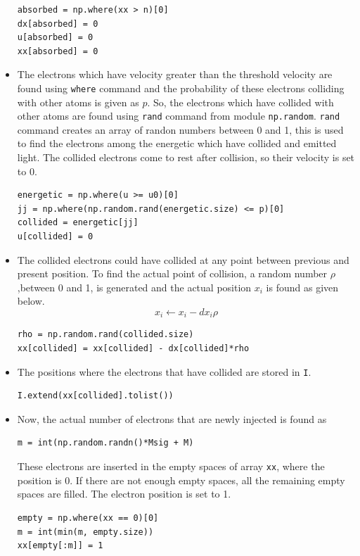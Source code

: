 \documentclass[12pt, a4paper]{article}
\begin{document}
\begin{itemize}
\begin{lstlisting}
absorbed = np.where(xx > n)[0]
dx[absorbed] = 0
u[absorbed] = 0
xx[absorbed] = 0
\end{lstlisting}
\item The electrons which have velocity greater than the threshold velocity are found using \texttt{where} command and the probability of these electrons colliding with other atoms is given as $p$. So, the electrons which have collided with other atoms are found using \texttt{rand} command from module \texttt{np.random}. \texttt{rand} command creates an array of randon numbers between 0 and 1, this is used to find the electrons among the energetic which have collided and emitted light. The collided electrons come to rest after collision, so their velocity is set to 0.
\begin{lstlisting}
energetic = np.where(u >= u0)[0]
jj = np.where(np.random.rand(energetic.size) <= p)[0]
collided = energetic[jj]
u[collided] = 0
\end{lstlisting}
\item The collided electrons could have collided at any point between previous and present position. To find the actual point of collision, a random number  $\rho$,between 0 and 1, is generated and the actual position $x_i$ is found as given below.
\begin{equation*}
x_i \leftarrow x_i - dx_i \rho
\end{equation*}
\begin{lstlisting}
rho = np.random.rand(collided.size)
xx[collided] = xx[collided] - dx[collided]*rho
\end{lstlisting}
\item The positions where the electrons that have collided are stored in \texttt{I}.
\begin{lstlisting}
I.extend(xx[collided].tolist())
\end{lstlisting}
\item Now, the actual number of electrons that are newly injected is found as
\begin{lstlisting}
m = int(np.random.randn()*Msig + M)
\end{lstlisting}
These electrons are inserted in the empty spaces of array \texttt{xx}, where the position is 0. If there are not enough empty spaces, all the remaining empty spaces are filled. The electron position is set to 1.
\begin{lstlisting}
empty = np.where(xx == 0)[0]
m = int(min(m, empty.size))
xx[empty[:m]] = 1
\end{lstlisting}

\end{itemize}
\end{document}
